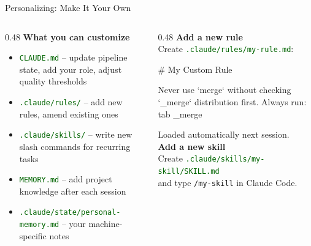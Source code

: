 \documentclass[aspectratio=169,11pt,dvipsnames]{beamer}
\newcommand{\file}[1]{\textcolor{darkgreen}{\nolinkurl{#1}}}
\begin{document}
\begin{frame}[fragile]{Personalizing: Make It Your Own}
  \begin{columns}[T]
    \begin{column}{0.48\textwidth}
      \textbf{What you can customize}
      \begin{itemize}\setlength\itemsep{4pt}
        \item \file{CLAUDE.md} -- update pipeline state, add your role, adjust quality thresholds
        \item \file{.claude/rules/} -- add new rules, amend existing ones
        \item \file{.claude/skills/} -- write new slash commands for recurring tasks
        \item \file{MEMORY.md} -- add project knowledge after each session
        \item \file{.claude/state/personal-memory.md} -- your machine-specific notes
      \end{itemize}
    \end{column}
    \begin{column}{0.48\textwidth}
      \textbf{Add a new rule}\\[4pt]
      Create \file{.claude/rules/my-rule.md}:
      \begin{codebox}
\# My Custom Rule

Never use `merge` without checking
`_merge` distribution first.
Always run: tab _merge
      \end{codebox}
      Loaded automatically next session.\\[0.3cm]
      \textbf{Add a new skill}\\[4pt]
      Create \file{.claude/skills/my-skill/SKILL.md}\\
      and type \texttt{/my-skill} in Claude Code.
    \end{column}
  \end{columns}
\end{frame}
\end{document}
